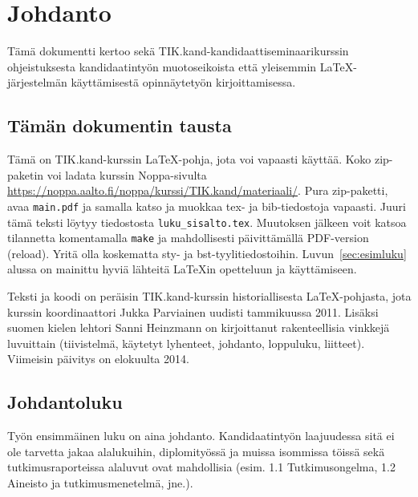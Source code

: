 
\section{Johdanto}

Tämä dokumentti kertoo sekä TIK.kand-kandidaattiseminaarikurssin
ohjeistuksesta kandidaatintyön muotoseikoista että yleisemmin
\LaTeX{}-järjestelmän käyttämisestä opinnäytetyön kirjoittamisessa.

\subsection{Tämän dokumentin tausta}

\begin{sloppypar} 
  Tämä on TIK.kand-kurssin \LaTeX{}-pohja, jota voi vapaasti
  käyttää. Koko zip-paketin voi ladata kurssin Noppa-sivulta
  \url{https://noppa.aalto.fi/noppa/kurssi/TIK.kand/materiaali/}.
  Pura zip-paketti, avaa \verb!main.pdf! ja samalla katso ja muokkaa
  tex- ja bib-tiedostoja vapaasti. Juuri tämä teksti löytyy
  tiedostosta \verb!luku_sisalto.tex!. Muutoksen jälkeen voit katsoa
  tilannetta komentamalla \verb!make! ja mahdollisesti päivittämällä
  PDF-version (reload). Yritä olla koskematta sty- ja
  bst-tyylitiedostoihin. Luvun~\ref{sec:esimluku} alussa on mainittu
  hyviä lähteitä \LaTeX{}in opetteluun ja käyttämiseen.
\end{sloppypar}

Teksti ja koodi on peräisin TIK.kand-kurssin historiallisesta
\LaTeX{}-pohjasta, jota kurssin koordinaattori Jukka Parviainen
uudisti tammikuussa 2011.  Lisäksi suomen kielen lehtori Sanni
Heinzmann on kirjoittanut rakenteellisia vinkkejä luvuittain
(tiivistelmä, käytetyt lyhenteet, johdanto, loppuluku, liitteet).
Viimeisin päivitys on elokuulta 2014.

\subsection{Johdantoluku}

Työn ensimmäinen luku on aina johdanto. Kandidaatintyön laajuudessa
sitä ei ole tarvetta jakaa alalukuihin, diplomityössä ja muissa
isommissa töissä sekä tutkimusraporteissa alaluvut ovat mahdollisia
(esim. 1.1 Tutkimusongelma, 1.2 Aineisto ja tutkimusmenetelmä, jne.).

